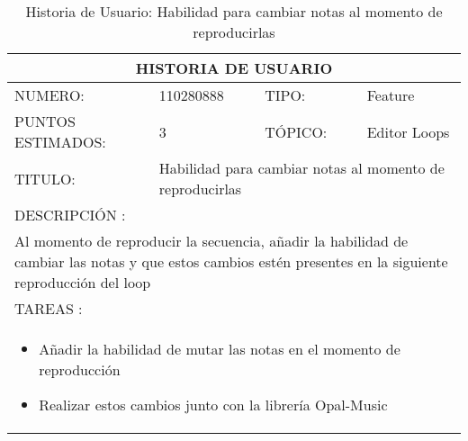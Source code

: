 \begin{table}[h]
\centering
\renewcommand{\arraystretch}{1.4}
\begin{tabular}{|*{4}{l|}}
\hline
\multicolumn{4}{|c|}{HISTORIA DE USUARIO} \\ \hline
NUMERO: & 110280888 & TIPO: & Feature \\ \hline
PUNTOS ESTIMADOS: & 3 & TÓPICO: & Editor Loops \\ \hline
TITULO: & \multicolumn{3}{|p{7.2cm}|}{Habilidad para cambiar notas al momento de reproducirlas} \\ \hline
\multicolumn{4}{|l|}{DESCRIPCIÓN : } \\ \hline
\multicolumn{4}{|p{11cm}|}{Al momento de reproducir la secuencia, añadir la habilidad de cambiar las notas y que estos cambios estén presentes en la siguiente reproducción del loop} \\ \hline
\multicolumn{4}{|l|}{TAREAS : } \\ \hline
\multicolumn{4}{|p{11cm}|}{
\begin{minipage}[t]{\hsize}
  \begin{itemize}
    \item Añadir la habilidad de mutar las notas en el momento de reproducción
    \item Realizar estos cambios junto con la librería Opal-Music
  \end{itemize}
\end{minipage}
} \\ \hline
\end{tabular}
\caption{Historia de Usuario: Habilidad para cambiar notas al momento de reproducirlas}
\label{tab:Primero}
\end{table}

